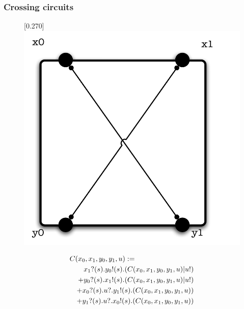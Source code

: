 \documentclass{beamer}
\begin{document}
\begin{frame}
  \frametitle{Crossing circuits}
  \begin{figure}[tbp]
    \centering
    \scalebox{0.27}[0.270]{\includegraphics[viewport=0 0 390 360]{BasicCrossingCircuit}}
\end{figure}
\begin{eqnarray}
  \lefteqn{ C(x_0,x_1,y_0,y_1,u) := } \nonumber \\
  & & x_1?(s).y_0!(s).(C(x_0,x_1,y_0,y_1,u)|u!) \nonumber \\
  & & + y_0?(s).x_1!(s).(C(x_0,x_1,y_0,y_1,u)|u!) \nonumber \\
  & & + x_0?(s).u?.y_1!(s).(C(x_0,x_1,y_0,y_1,u)) \nonumber \\
  & & + y_1?(s).u?.x_0!(s).(C(x_0,x_1,y_0,y_1,u)) \nonumber
\end{eqnarray}
\end{frame}
\end{document}
